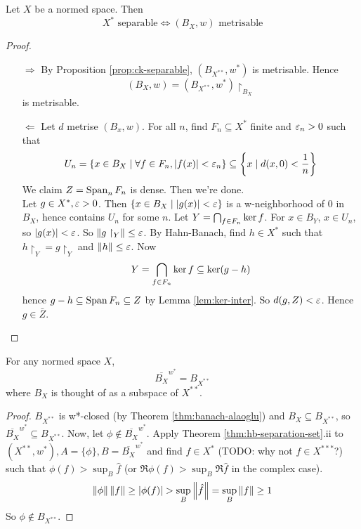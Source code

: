 \documentclass{article}
\begin{document}
\begin{nprop}
  Let $X$ be a normed space. Then
  $$X^* \text{ separable} \iff (B_X, w) \text{ metrisable}$$
\end{nprop}
\begin{proof}~
  \begin{itemize}
    \item[$\Rightarrow$] By Proposition \ref{prop:ck-separable}, $(B_{X^{**}}, w^*)$ is metrisable. Hence
    $$(B_X, w) = (B_{X^{**}}, w^*)\restriction_{B_X}$$
    is metrisable.
    \item[$\Leftarrow$] Let $d$ metrise $(B_x, w)$. For all $n$, find $F_n \subseteq X^*$ finite and $\varepsilon_n > 0$ such that
    $$U_n = \{x \in B_X \mid \forall f \in F_n, \left\lvert f(x)\right\rvert < \varepsilon_n\} \subseteq \left\{ x \mid d(x, 0) < \frac 1n\right\}$$
    We claim $Z = \operatorname{Span}_n F_n$ is dense. Then we're done. \\
    Let $g \in X^*, \varepsilon > 0$. Then $\{x \in B_X \mid \left\lvert g(x)\right\rvert < \varepsilon\}$ is a w-neighborhood of $0$ in $B_X$, hence contains $U_n$ for some $n$. Let $Y = \bigcap_{f \in F_n} \ker f$. For $x \in B_Y$, $x \in U_n$, so $\left\lvert g(x)\right\rvert < \varepsilon$. So $\left\lVert g\restriction_Y\right\rVert \le \varepsilon$. By Hahn-Banach, find $h \in X^*$ such that $h\restriction_Y = g\restriction_Y$ and $\left\lVert h\right\rVert \le \varepsilon$. Now
    $$Y = \bigcap_{f \in F_n} \ker f \subseteq \ker(g - h)$$
    hence $g - h \subseteq \operatorname{Span} F_n \subseteq Z$ by Lemma \ref{lem:ker-inter}. So $d(g, Z) < \varepsilon$. Hence $g \in \bar Z$.
  \end{itemize}
\end{proof}

\begin{nthm}[Goldstine]\label{thm:goldstine}
  For any normed space $X$,
  $$\overline{B_X}^{w^*} = B_{X^{**}}$$
  where $B_X$ is thought of as a subspace of $X^{**}$.
\end{nthm}
\begin{proof}
  $B_{X^{**}}$ is w*-closed (by Theorem \ref{thm:banach-alaoglu}) and $B_X \subseteq B_{X^{**}}$, so $\overline{B_X}^{w^*} \subseteq B_{X^{**}}$. Now, let $\phi \nin \overline{B_X}^{w^*}$. Apply Theorem \ref{thm:hb-separation-set}.ii to $(X^{**}, w^*), A = \{\phi\}, B = \overline{B_X}^{w^*}$ and find $f \in X^*$ (TODO: why not $f \in X^{***}$?) such that $\phi(f) > \sup_B \hat f$ (or $\Re \phi(f) > \sup_B \Re \hat f$ in the complex case).
  $$\left\lVert \phi\right\rVert\left\lVert f\right\rVert \ge \left\lvert \phi(f)\right\rvert > \sup_B \left\lVert \hat f\right\rVert = \sup_B \left\lVert f\right\rVert \ge 1$$
  So $\phi \nin B_{X^{**}}$.
\end{proof}

\newlec
\end{document}
